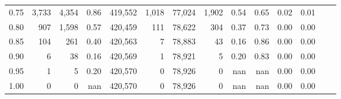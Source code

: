 \begin{tabular}{rrrrrrrrrrrrrr}
0.75 &   3,733 &   4,354 &    0.86 &  419,552 &    1,018 &  77,024 &   1,902 &  0.54 &  0.65 &  0.02 &      0.01 \\
0.80 &     907 &   1,598 &    0.57 &  420,459 &      111 &  78,622 &     304 &  0.37 &  0.73 &  0.00 &      0.00 \\
0.85 &     104 &     261 &    0.40 &  420,563 &        7 &  78,883 &      43 &  0.16 &  0.86 &  0.00 &      0.00 \\
0.90 &       6 &      38 &    0.16 &  420,569 &        1 &  78,921 &       5 &  0.20 &  0.83 &  0.00 &      0.00 \\
0.95 &       1 &       5 &    0.20 &  420,570 &        0 &  78,926 &       0 &   nan &   nan &  0.00 &      0.00 \\
1.00 &       0 &       0 &     nan &  420,570 &        0 &  78,926 &       0 &   nan &   nan &  0.00 &      0.00 \\
\bottomrule
\end{tabular}
